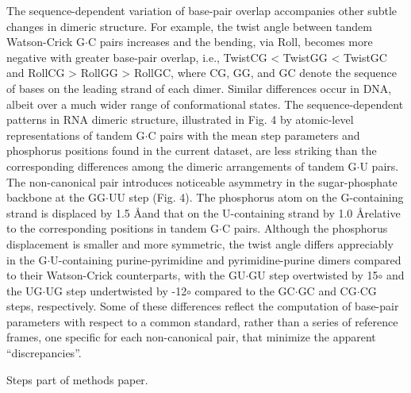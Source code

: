 The  sequence-dependent variation of  base-pair overlap  accompanies
other  subtle changes  in dimeric  structure. For  example,  the twist
angle between  tandem Watson-Crick  G$\cdot$C pairs increases  and the
bending,  via Roll,  becomes  more negative  with  greater base-pair
overlap,  i.e., TwistCG  < TwistGG  < TwistGC  and RollCG  >  RollGG >
RollGC,  where CG,  GG, and  GC denote  the sequence  of bases  on the
leading strand of each dimer. Similar differences occur in DNA, albeit
over  a  much  wider  range  of  conformational  states.  The
sequence-dependent patterns in RNA dimeric structure, illustrated in
Fig. 4 by atomic-level  representations of tandem G$\cdot$C pairs with
the mean step parameters and phosphorus positions found in the current
dataset, are less striking  than the corresponding differences among
the dimeric arrangements of  tandem G$\cdot$U pairs. The non-canonical
pair introduces  noticeable asymmetry in  the sugar-phosphate backbone
at  the  GG$\cdot$UU  step  (Fig.  4).  The  phosphorus  atom  on  the
G-containing strand is displaced by 1.5 \AA and that on the U-containing
strand  by 1.0  \AA relative  to the  corresponding positions  in tandem
G$\cdot$C pairs. Although the phosphorus displacement is smaller and
more  symmetric,  the  twist   angle  differs  appreciably  in  the
G$\cdot$U-containing purine-pyrimidine and pyrimidine-purine dimers
compared to their Watson-Crick counterparts, with the GU$\cdot$GU step
overtwisted  by 15$\circ$  and  the UG$\cdot$UG  step undertwisted  by
-12$\circ$ compared to the GC$\cdot$GC and CG$\cdot$CG steps, respectively. Some
of these  differences reflect the computation  of base-pair parameters
with respect to  a common standard, rather than  a series of reference
frames, one  specific for each  non-canonical pair, that  minimize the
apparent ``discrepancies''.



Steps part of methods paper.




